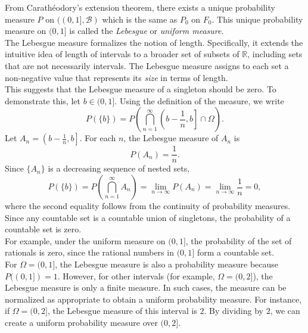     From Carathéodory's extension theorem, there exists a unique probability measure $P$ on $((0, 1], \mathcal{B})$ which is the same as $P_0$ on $F_0$. This unique probability measure on $(0, 1]$ is called the \textit{Lebesgue} or \textit{uniform measure}.\\

    The Lebesgue measure formalizes the notion of length. Specifically, it extends the intuitive idea of length of intervals to a broader set of subsets of $\mathbb{R}$, including sets that are not necessarily intervals. The Lebesgue measure assigns to each set a non-negative value that represents its \textit{size} in terms of length.\\

This suggests that the Lebesgue measure of a singleton should be zero. To demonstrate this, let $b \in (0, 1]$. Using the definition of the measure, we write
\[
P(\{b\}) = P\left(\bigcap_{n=1}^{\infty} \left(b - \frac{1}{n}, b\right] \cap \Omega\right).
\]
Let $A_n = \left(b - \frac{1}{n}, b\right]$. For each $n$, the Lebesgue measure of $A_n$ is
\[
P(A_n) = \frac{1}{n}.
\]
Since $\{A_n\}$ is a decreasing sequence of nested sets,
\[
P(\{b\}) = P\left(\bigcap_{n=1}^{\infty} A_n\right) = \lim_{n \to \infty} P(A_n) = \lim_{n \to \infty} \frac{1}{n} = 0,
\]
where the second equality follows from the continuity of probability measures.\\

Since any countable set is a countable union of singletons, the probability of a countable set is zero.\\

For example, under the uniform measure on $(0, 1]$, the probability of the set of rationals is zero, since the rational numbers in $(0, 1]$ form a countable set.\\

For $\Omega = (0, 1]$, the Lebesgue measure is also a probability measure because $P((0, 1]) = 1$. However, for other intervals (for example, $\Omega = (0, 2]$), the Lebesgue measure is only a finite measure. In such cases, the measure can be normalized as appropriate to obtain a uniform probability measure. For instance, if $\Omega = (0, 2]$, the Lebesgue measure of this interval is $2$. By dividing by $2$, we can create a uniform probability measure over $(0, 2]$.

